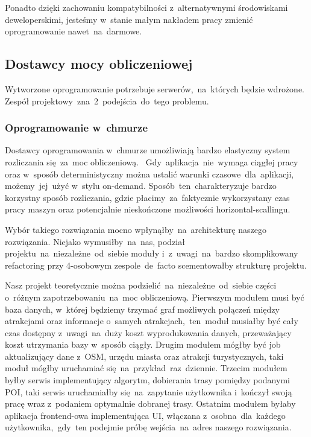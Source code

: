 Ponadto dzięki zachowaniu kompatybilności z~alternatywnymi środowiskami deweloperskimi, jesteśmy w~stanie małym nakładem pracy zmienić oprogramowanie nawet~na~darmowe.

\subsection{Dostawcy mocy obliczeniowej}
\label{subsec:dostawcy-mocy-obliczeniowej}
Wytworzone oprogramowanie potrzebuje serwerów,~na~których będzie wdrożone.
Zespół projektowy~zna~2~podejścia~do~tego problemu.

\subsubsection{Oprogramowanie w~chmurze}
\indent Dostawcy oprogramowania w~chmurze umożliwiają bardzo elastyczny system rozliczania się~za~moc obliczeniową.
~Gdy~aplikacja~nie~wymaga ciągłej pracy oraz w~sposób deterministyczny można ustalić warunki czasowe~dla~aplikacji, możemy~jej~użyć w~stylu \gls{on-demand}.
Sposób~ten~charakteryzuje bardzo korzystny sposób rozliczania, gdzie płacimy~za~faktycznie wykorzystany czas pracy maszyn oraz potencjalnie nieskończone możliwości horizontal-scallingu.

\indent Wybór takiego rozwiązania mocno wpłynąłby~na~architekturę naszego rozwiązania.
Niejako wymusiłby~na~nas, podział projektu~na~niezależne~od~siebie moduły i~z~uwagi~na~bardzo skomplikowany \gls{refactoring} przy 4-osobowym zespole~de~facto scementowałby strukturę projektu.

\indent Nasz projekt teoretycznie można podzielić~na~niezależne~od~siebie części o~różnym zapotrzebowaniu~na~moc obliczeniową.
Pierwszym modułem musi być baza danych, w~której będziemy trzymać graf możliwych połączeń między atrakcjami oraz informacje o~samych atrakcjach,~ten~moduł musiałby być cały czas dostępny z~uwagi~na~duży koszt wyprodukowania danych, przeważający koszt utrzymania bazy w~sposób ciągły.
Drugim modułem mógłby być \gls{job} aktualizujący dane z~OSM, urzędu miasta oraz atrakcji turystycznych, taki moduł mógłby uruchamiać się~na~przykład~raz~dziennie.
Trzecim modułem byłby serwis implementujący algorytm, dobierania trasy pomiędzy podanymi POI, taki serwis uruchamiałby się~na~zapytanie użytkownika i~kończył swoją pracę wraz z~podaniem optymalnie dobranej trasy.
Ostatnim modułem byłaby aplikacja \gls{frontend}-owa implementująca UI, włączana z~osobna~dla~każdego użytkownika,~gdy~ten podejmie próbę wejścia~na~adres naszego rozwiązania.


